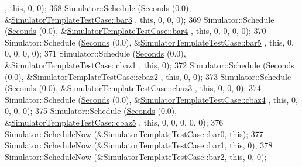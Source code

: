 \begin{DoxyCode}
      , \textcolor{keyword}{this}, 0, 0);
368   Simulator::Schedule (\hyperlink{group__timecivil_ga33c34b816f8ff6628e33d5c8e9713b9e}{Seconds} (0.0), &\hyperlink{classSimulatorTemplateTestCase_aea52cc1b6dabac3782131bc96f7e3556}{SimulatorTemplateTestCase::bar3}
      , \textcolor{keyword}{this}, 0, 0, 0);
369   Simulator::Schedule (\hyperlink{group__timecivil_ga33c34b816f8ff6628e33d5c8e9713b9e}{Seconds} (0.0), &\hyperlink{classSimulatorTemplateTestCase_a0a46a38ced46c32a980d1458f23f26ac}{SimulatorTemplateTestCase::bar4}
      , \textcolor{keyword}{this}, 0, 0, 0, 0);
370   Simulator::Schedule (\hyperlink{group__timecivil_ga33c34b816f8ff6628e33d5c8e9713b9e}{Seconds} (0.0), &\hyperlink{classSimulatorTemplateTestCase_a75066b2e82301377dddc07d887c96853}{SimulatorTemplateTestCase::bar5}
      , \textcolor{keyword}{this}, 0, 0, 0, 0, 0);
371   Simulator::Schedule (\hyperlink{group__timecivil_ga33c34b816f8ff6628e33d5c8e9713b9e}{Seconds} (0.0), &\hyperlink{classSimulatorTemplateTestCase_a893ae41537567fc7e95f011f370e74ba}{SimulatorTemplateTestCase::cbaz1}
      , \textcolor{keyword}{this}, 0);
372   Simulator::Schedule (\hyperlink{group__timecivil_ga33c34b816f8ff6628e33d5c8e9713b9e}{Seconds} (0.0), &\hyperlink{classSimulatorTemplateTestCase_a0e58a1e62ebad4e4d0717cc64075c496}{SimulatorTemplateTestCase::cbaz2}
      , \textcolor{keyword}{this}, 0, 0);
373   Simulator::Schedule (\hyperlink{group__timecivil_ga33c34b816f8ff6628e33d5c8e9713b9e}{Seconds} (0.0), &\hyperlink{classSimulatorTemplateTestCase_a89bc22b2a32d6cdf026e8f7209a2fbbd}{SimulatorTemplateTestCase::cbaz3}
      , \textcolor{keyword}{this}, 0, 0, 0);
374   Simulator::Schedule (\hyperlink{group__timecivil_ga33c34b816f8ff6628e33d5c8e9713b9e}{Seconds} (0.0), &\hyperlink{classSimulatorTemplateTestCase_ac464eb9dcde4c15e5f63e9ae61fbc5a7}{SimulatorTemplateTestCase::cbaz4}
      , \textcolor{keyword}{this}, 0, 0, 0, 0);
375   Simulator::Schedule (\hyperlink{group__timecivil_ga33c34b816f8ff6628e33d5c8e9713b9e}{Seconds} (0.0), &\hyperlink{classSimulatorTemplateTestCase_a68c3789ba056bcddf5f1575d4c9c0548}{SimulatorTemplateTestCase::cbaz5}
      , \textcolor{keyword}{this}, 0, 0, 0, 0, 0);
376   Simulator::ScheduleNow (&\hyperlink{classSimulatorTemplateTestCase_a7c53480e1b906bfeaea5e0070ff5cc0c}{SimulatorTemplateTestCase::bar0}, \textcolor{keyword}{this});
377   Simulator::ScheduleNow (&\hyperlink{classSimulatorTemplateTestCase_a83631fe15f6b4aaffcf702e71a664205}{SimulatorTemplateTestCase::bar1}, \textcolor{keyword}{this}, 0);
378   Simulator::ScheduleNow (&\hyperlink{classSimulatorTemplateTestCase_a0a416b76615bb0e90f1312694f09133b}{SimulatorTemplateTestCase::bar2}, \textcolor{keyword}{this}, 0, 0);

\end{DoxyCode}
